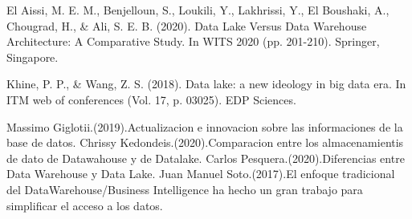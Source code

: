 \documentclass{article}
\begin{document}
\begin{thebibliography}{XXX0000}

     El Aissi, M. E. M., Benjelloun, S., Loukili, Y., Lakhrissi, Y., El Boushaki, A., Chougrad, H., \& Ali, S. E. B. (2020). Data Lake Versus Data Warehouse Architecture: A Comparative Study. In WITS 2020 (pp. 201-210). Springer, Singapore.
    
     Khine, P. P., \& Wang, Z. S. (2018). Data lake: a new ideology in big data era. In ITM web of conferences (Vol. 17, p. 03025). EDP Sciences.
    
    Massimo Giglotii.(2019).Actualizacion e innovacion sobre las informaciones de la base de datos.
     Chrissy Kedondeis.(2020).Comparacion entre los almacenamientis de dato de Datawahouse y de Datalake.
      Carlos Pesquera.(2020).Diferencias entre Data Warehouse y Data Lake.
     Juan Manuel Soto.(2017).El enfoque tradicional del DataWarehouse/Business Intelligence ha hecho un gran trabajo para simplificar el acceso a los datos.


\end{thebibliography}
    
\end{document}
